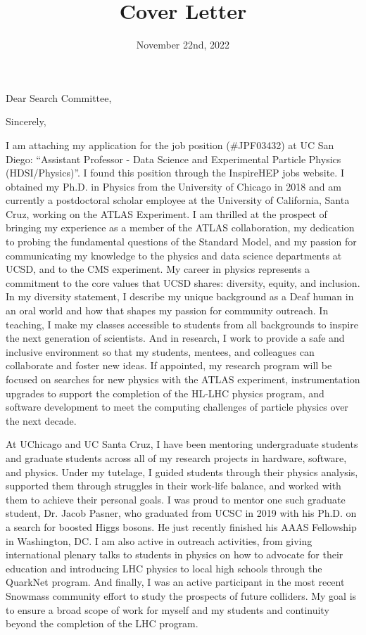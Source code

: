 \documentclass[10pt,letterpaper,sans]{moderncv} %
\title{Cover Letter}
\begin{document}
\date{November 22nd, 2022}
\opening{Dear Search Committee,}
\closing{Sincerely,}

\makelettertitle
\vspace*{-1em}

I am attaching my application for the job position (\#JPF03432) at UC San Diego: ``Assistant Professor - Data Science and Experimental Particle Physics (HDSI/Physics)''. I found this position through the InspireHEP jobs website. I obtained my Ph.D. in Physics from the University of Chicago in 2018 and am currently a postdoctoral scholar employee at the University of California, Santa Cruz, working on the ATLAS Experiment. I am thrilled at the prospect of bringing my experience as a member of the ATLAS collaboration, my dedication to probing the fundamental questions of the Standard Model, and my passion for communicating my knowledge to the physics and data science departments at UCSD, and to the CMS experiment. My career in physics represents a commitment to the core values that UCSD shares: diversity, equity, and inclusion. In my diversity statement, I describe my unique background as a Deaf human in an oral world and how that shapes my passion for community outreach. In teaching, I make my classes accessible to students from all backgrounds to inspire the next generation of scientists. And in research, I work to provide a safe and inclusive environment so that my students, mentees, and colleagues can collaborate and foster new ideas. If appointed, my research program will be focused on searches for new physics with the ATLAS experiment, instrumentation upgrades to support the completion of the HL-LHC physics program, and software development to meet the computing challenges of particle physics over the next decade.

At UChicago and UC Santa Cruz, I have been mentoring undergraduate students and graduate students across all of my research projects in hardware, software, and physics. Under my tutelage, I guided students through their physics analysis, supported them through struggles in their work-life balance, and worked with them to achieve their personal goals. I was proud to mentor one such graduate student, Dr. Jacob Pasner, who graduated from UCSC in 2019 with his Ph.D. on a search for boosted Higgs bosons. He just recently finished his AAAS Fellowship in Washington, DC. I am also active in outreach activities, from giving international plenary talks to students in physics on how to advocate for their education and introducing LHC physics to local high schools through the QuarkNet program. And finally, I was an active participant in the most recent Snowmass community effort to study the prospects of future colliders. My goal is to ensure a broad scope of work for myself and my students and continuity beyond the completion of the LHC program.
\end{document}
